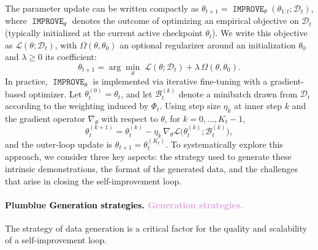 \documentclass{article}
\newcommand{\IMPROVE}{\operatorname{\mathtt{IMPROVE}}}
\let\oldtextcolor\textcolor
\renewcommand{\textcolor}[2]{
  \def\temp{#1}
  \def\red{blue}
  \ifx\temp\red
    \oldtextcolor{black}{#2}
  \else
    \oldtextcolor{#1}{#2}
  \fi
}
\begin{document}
The parameter update can be written compactly as $\theta_{t+1}=\IMPROVE_{\theta}(\theta_{1:t};\mathcal{D}_t)$, where $\IMPROVE_{\theta}$ denotes the outcome of optimizing an empirical objective on $\mathcal{D}_t$ (typically initialized at the current active checkpoint $\theta_t$). We write this objective as $\mathcal{L}(\theta;\mathcal{D}_t)$, with $\Omega(\theta,\theta_0)$ an optional regularizer around an initialization $\theta_0$ and $\lambda\ge 0$ its coefficient:
\begin{equation}
\theta_{t+1}=\arg\min_{\theta}\;\mathcal{L}(\theta;\mathcal{D}_t)+\lambda\,\Omega(\theta,\theta_0).
\end{equation}
In practice, $\IMPROVE_{\theta}$ is implemented via iterative fine-tuning with a gradient-based optimizer. Let $\theta_t^{(0)}=\theta_t$, and let $\mathcal{B}_t^{(k)}$ denote a minibatch drawn from $\mathcal{D}_t$ according to the weighting induced by $\Phi_t$. Using step size $\eta_k$ at inner step $k$ and the gradient operator $\nabla_{\theta}$ with respect to $\theta$, for $k=0,\dots,K_t-1$,
\begin{equation}
\theta_t^{(k+1)}=\theta_t^{(k)}-\eta_k\,\nabla_{\theta}\mathcal{L}\big(\theta_t^{(k)};\mathcal{B}_t^{(k)}\big),
\end{equation}
and the outer-loop update is $\theta_{t+1}=\theta_t^{(K_t)}$. To systematically explore this approach, we consider three key aspects: the strategy used to generate these intrinsic demonstrations, the format of the generated data, and the challenges that arise in closing the self-improvement loop.


\paragraph{\textcolor{Plum}{Generation strategies.}}
The strategy of data generation is a critical factor for the quality and scalability of a self-improvement loop. 
\end{document}
